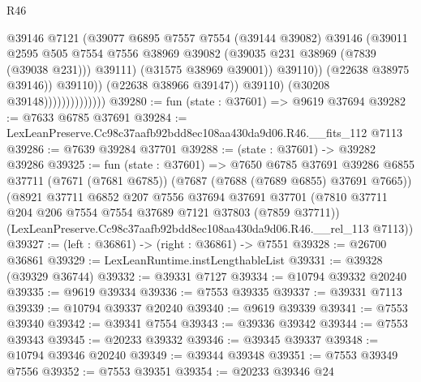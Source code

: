 \begin{lexlean}{R46}
\begin{coremodule}
                                            @39146
                                            @7121
                                            (@39077
                                              @6895
                                              @7557
                                              @7554
                                              (@39144 @39082)
                                              @39146
                                              (@39011
                                                @2595
                                                @505
                                                @7554
                                                @7556
                                                @38969
                                                @39082
                                                (@39035 @231 @38969 (@7839 (@39038 @231)))
                                                @39111)
                                              (@31575 @38969 @39001))
                                            @39110))
                                        (@22638 @38975 @39146))
                                      @39110))
                                  (@22638 @38966 @39147))
                                @39110)
                              (@30208 @39148))))))))))))))
@39280 := fun (state : @37601) => @9619 @37694
@39282 := @7633 @6785 @37691
@39284 := LexLeanPreserve.Cc98c37aafb92bdd8ec108aa430da9d06.R46.__fits_112 @7113
@39286 := @7639 @39284 @37701
@39288 := (state : @37601) -> @39282 @39286
@39325 := fun (state : @37601) =>
  @7650
    @6785
    @37691
    @39286
    @6855
    @37711
    (@7671 (@7681 @6785))
    (@7687 (@7688 (@7689 @6855) @37691 @7665))
    (@8921
      @37711
      @6852
      @207
      @7556
      @37694
      @37691
      @37701
      (@7810 @37711 @204 @206 @7554 @7554 @37689 @7121 @37803 (@7859 @37711))
      (LexLeanPreserve.Cc98c37aafb92bdd8ec108aa430da9d06.R46.__rel_113 @7113))
@39327 := (left : @36861) -> (right : @36861) -> @7551
@39328 := @26700 @36861
@39329 := LexLeanRuntime.instLengthableList
@39331 := @39328 (@39329 @36744)
@39332 := @39331 @7127
@39334 := @10794 @39332 @20240
@39335 := @9619 @39334
@39336 := @7553 @39335
@39337 := @39331 @7113
@39339 := @10794 @39337 @20240
@39340 := @9619 @39339
@39341 := @7553 @39340
@39342 := @39341 @7554
@39343 := @39336 @39342
@39344 := @7553 @39343
@39345 := @20233 @39332
@39346 := @39345 @39337
@39348 := @10794 @39346 @20240
@39349 := @39344 @39348
@39351 := @7553 @39349 @7556
@39352 := @7553 @39351
@39354 := @20233 @39346 @24

\end{coremodule}
\end{lexlean}
